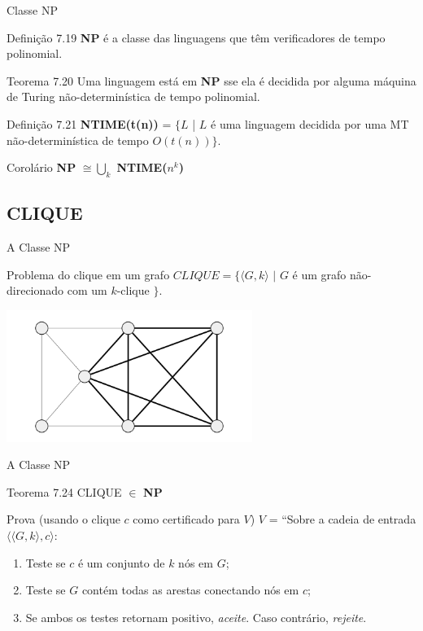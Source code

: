 \documentclass[xcolor=dvipsnames,table]{beamer}
\begin{document}
	\begin{frame}[shrink]{Classe NP}
		\begin{block}{Definição 7.19}
			{\bf NP} é a classe das linguagens que têm verificadores de tempo polinomial.
		\end{block} \pause
		\begin{block}{Teorema 7.20}
			Uma linguagem está em {\bf NP} sse ela é decidida por alguma máquina de Turing não-determinística de tempo polinomial.
		\end{block} \pause
		\begin{block}{Definição 7.21}
			{\bf NTIME(t(n))} = $\{L$ | $L$ é uma linguagem decidida por uma MT não-determinística de tempo $O(t(n)) \}$.
		\end{block} \pause
		\begin{exampleblock}{Corolário}
			{\bf NP} $ \cong \bigcup_k$ {\bf NTIME($n^k$)}
		\end{exampleblock}
	\end{frame}
	
	\subsection{CLIQUE}
	\begin{frame}{A Classe NP}
		\begin{block}{Problema do clique em um grafo}
			$CLIQUE = \{ \langle G, k \rangle \mbox{ | } G$ é um grafo não-direcionado com um $k$-clique $\}$.
		\end{block} \pause
		\begin{center}
			\includegraphics[width=8cm]{images/clique.png}
		\end{center}
	\end{frame}	
	
	\begin{frame}{A Classe NP}
		\begin{block}{Teorema 7.24}
			CLIQUE $\in$ {\bf NP}
		\end{block} \pause
		\begin{block}{Prova (usando o clique $c$ como certificado para $V$)}
			$V$ = ``Sobre a cadeia de entrada $\langle \langle G, k \rangle, c \rangle$:
			\begin{enumerate}
				\item Teste se $c$ é um conjunto de $k$ nós em $G$;
				\item Teste se $G$ contém todas as arestas conectando nós em $c$;
				\item Se ambos os testes retornam positivo, {\it aceite}. Caso contrário, {\it rejeite}.
			\end{enumerate}
		\end{block}
	\end{frame}
	
\end{document}
